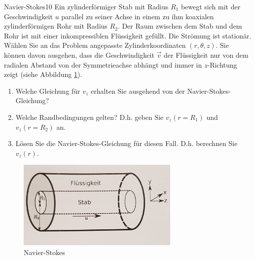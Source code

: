 \begin{exercise}{Navier-Stokes}{10}
  Ein zylinderförmiger Stab mit Radius $R_1$ bewegt sich mit der Geschwindigkeit $u$
  parallel zu seiner Achse in einem zu ihm koaxialen zylinderförmigen Rohr mit Radius
  $R_2$. Der Raum zwischen dem Stab und dem Rohr ist mit einer inkompressiblen
  Flüssigkeit gefüllt. Die Strömung ist stationär.\\
  Wählen Sie an das Problem angepasste Zylinderkoordinaten $(r, \theta, z)$. Sie
  können davon ausgehen, dass die Geschwindigkeit $\vec{v}$ der Flüssigkeit nur von
  dem radialen Abstand von der Symmetrieachse abhängt und immer in $z$-Richtung zeigt
  (siehe Abbildung \ref{fig:Skizze_Koaxial}).

  \begin{enumerate}
    \item Welche Gleichung für $v_z$ erhalten Sie ausgehend von der Navier-Stokes-Gleichung?
    \item Welche Randbedingungen gelten? D.h. geben Sie $v_z(r = R_1)$ und $v_z(r = R_2)$ an.
    \item Lösen Sie die Navier-Stokes-Gleichung für diesen Fall. D.h. berechnen Sie $v_z(r)$.
  \end{enumerate}

  \begin{figure}[h]
    \centering
    \includegraphics[width=0.7\textwidth]{Skizze_Navier_Stokes.jpg}
    \caption{Navier-Stokes}
    \label{fig:Skizze_Koaxial}
  \end{figure}

\end{exercise}
